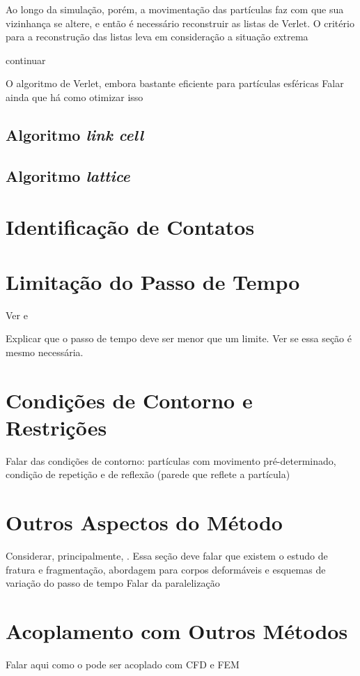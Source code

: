 Ao longo da simulação, porém, a movimentação das partículas faz  com que sua vizinhança se altere, e então é necessário reconstruir as listas de Verlet. O critério para a reconstrução das listas leva em consideração a situação extrema

\alert{continuar}

O algoritmo de Verlet, embora bastante eficiente para partículas esféricas \alert{Falar ainda que há como otimizar isso}

\subsection{Algoritmo \textit{link cell}}
\subsection{Algoritmo \textit{lattice}}

\section{Identificação de Contatos}

\section{Limitação do Passo de Tempo}

\alert{Ver  e }

\alert{Explicar que o passo de tempo deve ser menor que um limite. Ver se essa seção é mesmo necessária.}

\section{Condições de Contorno e Restrições} \label{sec:boundary_condition}

\alert{Falar das condições de contorno: partículas com movimento pré-determinado, condição de repetição e de reflexão (parede que reflete a partícula)}

\section{Outros Aspectos do Método}
\alert{Considerar, principalmente, . Essa seção deve falar que existem o estudo de fratura e fragmentação, abordagem para corpos deformáveis e esquemas de variação do passo de tempo}
\alert{Falar da paralelização}

\section{Acoplamento com Outros Métodos}
\alert{Falar aqui como o \DEM{} pode ser acoplado com CFD e FEM}